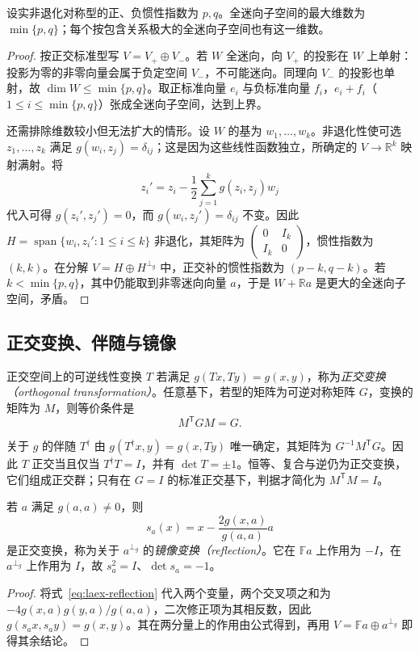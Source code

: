 \begin{theorem}
\label{thm:laex-witt-real}
设实非退化对称型的正、负惯性指数为 $p,q$。全迷向子空间的最大维数为 $\min\{p,q\}$；每个按包含关系极大的全迷向子空间也有这一维数。
\end{theorem}
\begin{proof}
按正交标准型写 $V=V_+\oplus V_-$。若 $W$ 全迷向，向 $V_+$ 的投影在 $W$ 上单射：投影为零的非零向量会属于负定空间 $V_-$，不可能迷向。同理向 $V_-$ 的投影也单射，故 $\dim W\le\min\{p,q\}$。取正标准向量 $e_i$ 与负标准向量 $f_i$，$e_i+f_i$（$1\le i\le\min\{p,q\}$）张成全迷向子空间，达到上界。

还需排除维数较小但无法扩大的情形。设 $W$ 的基为 $w_1,\ldots,w_k$。非退化性使可选 $z_1,\ldots,z_k$ 满足 $g(w_i,z_j)=\delta_{ij}$；这是因为这些线性函数独立，所确定的 $V\to\mathbb R^k$ 映射满射。将
\[
 z_i'=z_i-\frac12\sum_{j=1}^k g(z_i,z_j)w_j
\]
代入可得 $g(z_i',z_j')=0$，而 $g(w_i,z_j')=\delta_{ij}$ 不变。因此 $H=\operatorname{span}\{w_i,z_i':1\le i\le k\}$ 非退化，其矩阵为 $\begin{pmatrix}0&I_k\\I_k&0\end{pmatrix}$，惯性指数为 $(k,k)$。在分解 $V=H\oplus H^{\perp_g}$ 中，正交补的惯性指数为 $(p-k,q-k)$。若 $k<\min\{p,q\}$，其中仍能取到非零迷向向量 $a$，于是 $W+\mathbb Ra$ 是更大的全迷向子空间，矛盾。
\end{proof}

\subsection{正交变换、伴随与镜像}

\begin{definition}
正交空间上的可逆线性变换 $T$ 若满足 $g(Tx,Ty)=g(x,y)$，称为\emph{正交变换（orthogonal transformation）}。任意基下，若型的矩阵为可逆对称矩阵 $G$，变换的矩阵为 $M$，则等价条件是
\begin{equation}
 M^{\mathsf T}GM=G.
 \label{eq:laex-orthogonal-matrix}
\end{equation}
\end{definition}

关于 $g$ 的伴随 $T^\dagger$ 由 $g(T^\dagger x,y)=g(x,Ty)$ 唯一确定，其矩阵为 $G^{-1}M^{\mathsf T}G$。因此 $T$ 正交当且仅当 $T^\dagger T=I$，并有 $\det T=\pm1$。恒等、复合与逆仍为正交变换，它们组成正交群；只有在 $G=I$ 的标准正交基下，判据才简化为 $M^{\mathsf T}M=I$。

\begin{proposition}
\label{prop:laex-reflection}
若 $a$ 满足 $g(a,a)\ne0$，则
\begin{equation}
 s_a(x)=x-\frac{2g(x,a)}{g(a,a)}a
 \label{eq:laex-reflection}
\end{equation}
是正交变换，称为关于 $a^{\perp_g}$ 的\emph{镜像变换（reflection）}。它在 $\mathbb Fa$ 上作用为 $-I$，在 $a^{\perp_g}$ 上作用为 $I$，故 $s_a^2=I$、$\det s_a=-1$。
\end{proposition}
\begin{proof}
将式~\eqref{eq:laex-reflection} 代入两个变量，两个交叉项之和为 $-4g(x,a)g(y,a)/g(a,a)$，二次修正项为其相反数，因此 $g(s_ax,s_ay)=g(x,y)$。其在两分量上的作用由公式得到，再用 $V=\mathbb Fa\oplus a^{\perp_g}$ 即得其余结论。
\end{proof}

